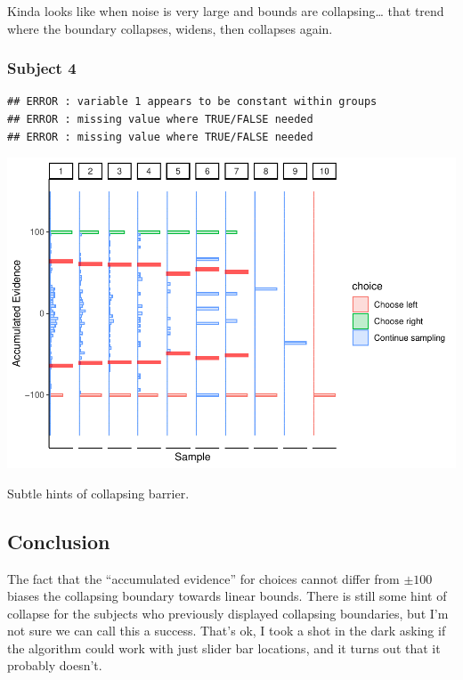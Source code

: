 \documentclass[
]{book}
\begin{document}
Kinda looks like when noise is very large and bounds are collapsing\ldots{} that trend where the boundary collapses, widens, then collapses again.

\hypertarget{subject-4-1}{%
\subsubsection*{Subject 4}\label{subject-4-1}}

\begin{verbatim}
## ERROR : variable 1 appears to be constant within groups 
## ERROR : missing value where TRUE/FALSE needed 
## ERROR : missing value where TRUE/FALSE needed
\end{verbatim}

\includegraphics{LateNightBayes_files/figure-latex/unnamed-chunk-26-1.pdf}

Subtle hints of collapsing barrier.

\hypertarget{conclusion-2}{%
\subsection*{Conclusion}\label{conclusion-2}}

The fact that the ``accumulated evidence'' for choices cannot differ from \(\pm 100\) biases the collapsing boundary towards linear bounds. There is still some hint of collapse for the subjects who previously displayed collapsing boundaries, but I'm not sure we can call this a success. That's ok, I took a shot in the dark asking if the algorithm could work with just slider bar locations, and it turns out that it probably doesn't.
\end{document}
